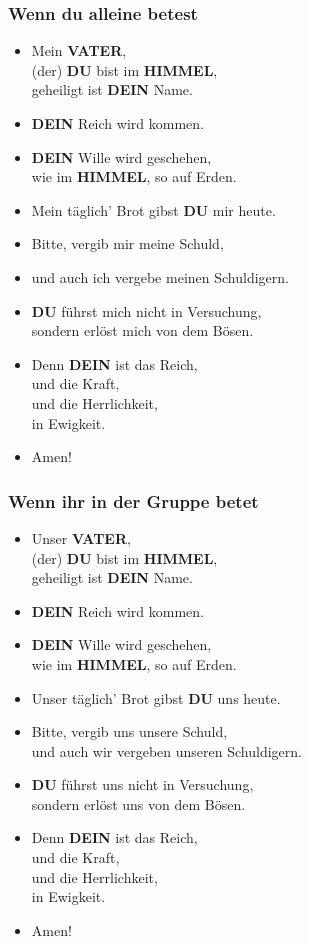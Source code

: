 \documentclass[10pt,a5paper]{article}
\newcommand{\Dein}[0]{\textbf{DEIN}}
\newcommand{\Du}[0]{\textbf{DU}}
\newcommand{\Himmel}[0]{\textbf{HIMMEL}}
\newcommand{\Vater}[0]{\textbf{VATER}}
\begin{document}
	\subsubsection{Wenn du alleine betest}
		\begin{itemize}[nosep]
			\item	Mein {\Vater},
					\\
					(der) {\Du} bist im {\Himmel},
					\\
					geheiligt ist {\Dein} Name.
			\item	{\Dein} Reich wird kommen.
			\item	{\Dein} Wille wird geschehen,
					\\
					wie im {\Himmel},
					so auf Erden.
			\item	Mein t\"aglich' Brot gibst {\Du} mir heute.
			\item	Bitte,
					vergib mir meine Schuld,
			\item[]	und auch ich vergebe meinen Schuldigern.
			\item	{\Du} f\"uhrst mich nicht in Versuchung,
					\\
					sondern erl\"ost mich von dem B\"osen.
			\item	Denn {\Dein} ist das Reich,
					\\
					und die Kraft,
					\\
					und die Herrlichkeit,
					\\
					in Ewigkeit.
			\item	Amen!
		\end{itemize}
			
	\subsubsection{Wenn ihr in der Gruppe betet}
		\begin{itemize}[nosep]
			\item	Unser {\Vater},
					\\
					(der) {\Du} bist im {\Himmel},
					\\
					geheiligt ist {\Dein} Name.
			\item	{\Dein} Reich wird kommen.
			\item	{\Dein} Wille wird geschehen,
					\\
					wie im {\Himmel},
					so auf Erden.
			\item	Unser t\"aglich' Brot gibst {\Du} uns heute.
			\item	Bitte,
					vergib uns unsere Schuld,
					\\
					und auch wir vergeben unseren Schuldigern.
			\item	{\Du} f\"uhrst uns nicht in Versuchung,
					\\
					sondern erl\"ost uns von dem B\"osen.
			\item	Denn {\Dein} ist das Reich,
					\\
					und die Kraft,
					\\
					und die Herrlichkeit,
					\\
					in Ewigkeit.
			\item	Amen!
		\end{itemize}
\end{document}
